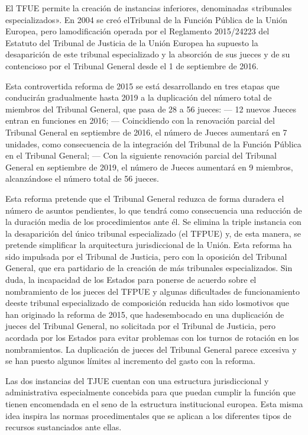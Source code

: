\documentclass[10pt,a4paper]{article}
\begin{document}
El TFUE permite la creación de instancias inferiores, denominadas «tribunales especializados». En 2004 se creó elTribunal de la Función Pública de la Unión Europea, pero lamodificación operada por el Reglamento 2015/24223 del Estatuto del Tribunal de Justicia de la Unión Europea ha supuesto la desaparición de este tribunal especializado y la absorción de sus jueces y de su contencioso por el Tribunal General desde el 1 de septiembre de 2016.

Esta controvertida reforma de 2015 se está desarrollando en tres etapas que conducirán gradualmente hasta 2019 a la duplicación del número total de miembros del Tribunal General, que pasa de 28 a 56 jueces:
— 12 nuevos Jueces entran en funciones en 2016;
— Coincidiendo con la renovación parcial del Tribunal General en septiembre de 2016, el número de Jueces aumentará en 7 unidades, como consecuencia de la integración del Tribunal de la Función Pública en el Tribunal General;
— Con la siguiente renovación parcial del Tribunal General en septiembre de 2019, el número de Jueces aumentará en 9 miembros, alcanzándose el número total de 56 jueces.

Esta reforma pretende que el Tribunal General reduzca de forma duradera el número de asuntos pendientes, lo que tendrá como consecuencia una reducción de la duración media de los procedimientos ante él. Se elimina la triple instancia con la desaparición del único tribunal especializado (el TFPUE) y, de esta manera, se pretende simplificar la arquitectura jurisdiccional de la Unión. Esta reforma ha sido impulsada por el Tribunal de Justicia, pero con la oposición del Tribunal General, que era partidario de la creación de más tribunales especializados. Sin duda, la incapacidad de los Estados para ponerse de acuerdo sobre el nombramiento de los jueces del TFPUE y algunas dificultades de funcionamiento deeste tribunal especializado de composición reducida han sido losmotivos que han originado la reforma de 2015, que hadesembocado en una duplicación de jueces del Tribunal General, no solicitada por el Tribunal de Justicia, pero acordada por los Estados para evitar problemas con los turnos de rotación en los nombramientos. La duplicación de jueces del Tribunal General parece excesiva y se han puesto algunos límites al incremento del gasto con la reforma.

Las dos instancias del TJUE cuentan con una estructura jurisdiccional y administrativa especialmente concebida para que puedan cumplir la función que tienen encomendada en el seno de la estructura institucional europea. Esta misma idea inspira las normas procedimentales que se aplican a los diferentes tipos de recursos sustanciados ante ellas.
\end{document}
